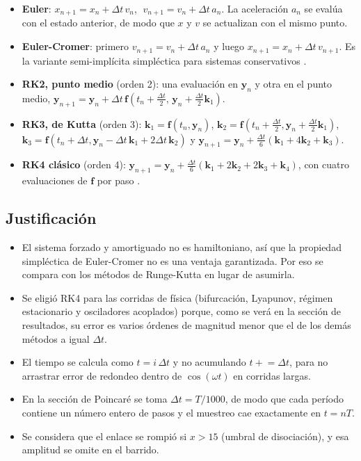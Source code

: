 \documentclass[12pt,a4paper]{article}
\begin{document}
\begin{itemize}
    \item \textbf{Euler}: $x_{n+1}=x_n+\Delta t\,v_n$, $\;v_{n+1}=v_n+\Delta t\,a_n$. La aceleración $a_n$ se evalúa con el estado anterior, de modo que $x$ y $v$ se actualizan con el mismo punto.
    \item \textbf{Euler-Cromer}: primero $v_{n+1}=v_n+\Delta t\,a_n$ y luego $x_{n+1}=x_n+\Delta t\,v_{n+1}$. Es la variante semi-implícita simpléctica para sistemas conservativos \cite{cromer1981}.
    \item \textbf{RK2, punto medio} (orden 2): una evaluación en $\mathbf y_n$ y otra en el punto medio, $\mathbf y_{n+1}=\mathbf y_n+\Delta t\,\mathbf f\!\left(t_n+\tfrac{\Delta t}{2},\,\mathbf y_n+\tfrac{\Delta t}{2}\mathbf k_1\right)$.
    \item \textbf{RK3, de Kutta} (orden 3): $\mathbf k_1=\mathbf f(t_n,\mathbf y_n)$, $\mathbf k_2=\mathbf f(t_n+\tfrac{\Delta t}{2},\mathbf y_n+\tfrac{\Delta t}{2}\mathbf k_1)$, $\mathbf k_3=\mathbf f(t_n+\Delta t,\mathbf y_n-\Delta t\,\mathbf k_1+2\Delta t\,\mathbf k_2)$ y $\mathbf y_{n+1}=\mathbf y_n+\tfrac{\Delta t}{6}(\mathbf k_1+4\mathbf k_2+\mathbf k_3)$.
    \item \textbf{RK4 clásico} (orden 4): $\mathbf y_{n+1}=\mathbf y_n+\tfrac{\Delta t}{6}(\mathbf k_1+2\mathbf k_2+2\mathbf k_3+\mathbf k_4)$, con cuatro evaluaciones de $\mathbf f$ por paso \cite{press2007}.
\end{itemize}


\subsection{Justificación}

\begin{itemize}
    \item El sistema forzado y amortiguado no es hamiltoniano, así que la propiedad simpléctica de Euler-Cromer no es una ventaja garantizada. Por eso se compara con los métodos de Runge-Kutta en lugar de asumirla.
    \item Se eligió RK4 para las corridas de física (bifurcación, Lyapunov, régimen estacionario y osciladores acoplados) porque, como se verá en la sección de resultados, su error es varios órdenes de magnitud menor que el de los demás métodos a igual $\Delta t$.
    \item El tiempo se calcula como $t=i\,\Delta t$ y no acumulando $t\mathrel{+}=\Delta t$, para no arrastrar error de redondeo dentro de $\cos(\omega t)$ en corridas largas.
    \item En la sección de Poincaré se toma $\Delta t=T/1000$, de modo que cada período contiene un número entero de pasos y el muestreo cae exactamente en $t=nT$.
    \item Se considera que el enlace se rompió si $x>15$ (umbral de disociación), y esa amplitud se omite en el barrido.
\end{itemize}
\end{document}

